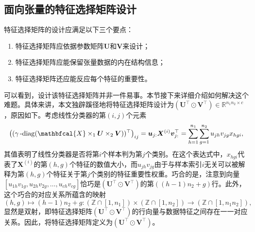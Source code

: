 \subsection{面向张量的特征选择矩阵设计}\label{sec:design-fsmatrix}
特征选择矩阵的设计应满足以下三个要点：
\begin{enumerate}
    \item 特征选择矩阵应依据参数矩阵$\boldsymbol{U}$和$\boldsymbol{V}$来设计；
    \item 特征选择矩阵应能保留张量数据的内在结构信息；
    \item 特征选择矩阵还应能反应每个特征的重要性。
\end{enumerate}
可以看到，设计该特征选择矩阵并非一件易事。本节接下来详细介绍如何解决这个难题。具体来讲，本文独辟蹊径地将特征选择矩阵设计为$(\boldsymbol{U}^{\top}\odot\boldsymbol{V}^{\top})\in\mathbb{R}^{n_{1}n_{2}\times c}$，原因如下。考虑线性分类器的第$(i,j)$个元素
\begin{equation*}
    \left((\mydiag(\mathbfcal{X}\times_{1}\boldsymbol{U}\times_{2}\boldsymbol{V}))^{\top}\right)_{ij}=\boldsymbol{u}_{j:}\boldsymbol{X}^{(i)}\boldsymbol{v}_{j:}^{\top}=\sum_{h=1}^{n_{1}}\sum_{g=1}^{n_{2}}u_{jh}v_{jg}x_{hgi},
\end{equation*}
其值表明了线性分类器是否将第$i$个样本判为第$j$个类别。在这个表达式中，$x_{hgi}$代表了$\boldsymbol{X}^{(i)}$的第$(h,g)$个特征的数值大小，而$u_{jh}v_{jg}$由于与样本索引$i$无关可以被解释为第$(h,g)$个特征关于第$j$个类别的特征重要性权重。巧合的是，注意到向量$[u_{1h}v_{1g},u_{2h}v_{2g},\ldots,u_{ch}v_{cg}]$恰巧是$(\boldsymbol{U}^{\top}\odot\boldsymbol{V}^{\top})$的第$((h-1)n_{2}+g)$行。此外，这个巧合的对应关系所蕴含的映射
\begin{equation*}
    (h,g)\mapsto (h-1)n_{2}+g:(\mathbb{Z}\cap [1,n_{1}])\times(\mathbb{Z}\cap [1,n_{2}])\rightarrow(\mathbb{Z}\cap [1,n_{1}n_{2}]),
\end{equation*}
显然是双射，即特征选择矩阵$(\boldsymbol{U}^{\top}\odot\boldsymbol{V}^{\top})$的行向量与数据特征之间存在一一对应关系。因此，将特征选择矩阵定义为$(\boldsymbol{U}^{\top}\odot\boldsymbol{V}^{\top})$。

